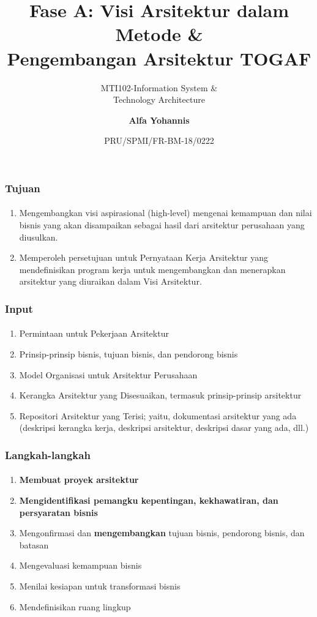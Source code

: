 \documentclass[aspectratio=169, table]{beamer}
\subtitle{MTI102-Information System \&\\Technology Architecture}
\title{Fase A: Visi Arsitektur dalam Metode \&\\ Pengembangan Arsitektur TOGAF}
\date[Serial]{\scriptsize {PRU/SPMI/FR-BM-18/0222}}
\author[Pradita]{\small {\textbf{Alfa Yohannis}}}
\begin{document}
	\frame{\titlepage}

	\begin{frame}
		\frametitle{Tujuan}
		\framesubtitle{\hspace{1cm}}
		\begin{enumerate}
			\item Mengembangkan visi aspirasional (high-level) mengenai kemampuan dan nilai bisnis yang akan disampaikan sebagai hasil dari arsitektur perusahaan yang diusulkan.
			\item Memperoleh persetujuan untuk Pernyataan Kerja Arsitektur yang mendefinisikan program kerja untuk mengembangkan dan menerapkan arsitektur yang diuraikan dalam Visi Arsitektur.
		\end{enumerate}
	\end{frame}

	\begin{frame}
		\frametitle{Input}
		\framesubtitle{\hspace{1cm}}
		\begin{enumerate}
			\item Permintaan untuk Pekerjaan Arsitektur
			\item Prinsip-prinsip bisnis, tujuan bisnis, dan pendorong bisnis
			\item Model Organisasi untuk Arsitektur Perusahaan
			\item Kerangka Arsitektur yang Disesuaikan, termasuk prinsip-prinsip arsitektur
			\item Repositori Arsitektur yang Terisi; yaitu, dokumentasi arsitektur yang ada (deskripsi kerangka kerja, deskripsi arsitektur, deskripsi dasar yang ada, dll.)
		\end{enumerate}
	\end{frame}

	\begin{frame}
		\frametitle{Langkah-langkah}
		\framesubtitle{\hspace{1cm}}
		\begin{enumerate}

			\item \textbf{Membuat proyek arsitektur}
			\item \textbf{Mengidentifikasi pemangku kepentingan, kekhawatiran, dan persyaratan bisnis}
			\item Mengonfirmasi dan \textbf{mengembangkan} tujuan bisnis, pendorong bisnis, dan batasan
			\item Mengevaluasi kemampuan bisnis
			\item Menilai kesiapan untuk transformasi bisnis
			\item Mendefinisikan ruang lingkup

		\end{enumerate}
	\end{frame}
\end{document}
